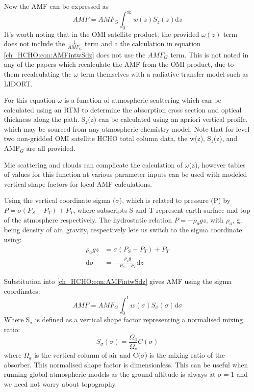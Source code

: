     Now the AMF can be expressed as
    \begin{equation} \label{ch_HCHO:eqn:AMFintwSdz}
      AMF = AMF_G \int_0^\infty w(z) S_z(z) \mathrm{d}z
    \end{equation}
    It's worth noting that in the OMI satellite product, the provided $\omega(z)$ term does not include the $\frac{1}{AMF_G}$ term and a the calculation in equation \ref{ch_HCHO:eqn:AMFintwSdz} does not use the $AMF_G$ term.
    This is not noted in any of the papers which recalculate the AMF from the OMI product, due to them recalculating the $\omega$ term themselves with a radiative transfer model such as LIDORT.
    
    For this equation $\omega$ is a function of atmospheric scattering which can be calculated using an RTM to determine the absorption cross section and optical thickness along the path.
    S$_z$(z) can be calculated using an apriori vertical profile, which may be sourced from any atmospheric chemistry model.
    Note that for level two non-gridded OMI satellite HCHO total column data, the w(z), S$_z$(z), and AMF$_G$ are all provided.
    
    Mie scattering and clouds can complicate the calculation of $\omega$(z), however tables of values for this function at various parameter inputs can be used with modeled vertical shape factors for local AMF calculations.
    
    Using the vertical coordinate sigma ($\sigma$), which is related to pressure (P) by $P=\sigma \left( P_S - P_T \right) + P_T$, where subscripts S and T represent earth surface and top of the atmosphere respectively.
    The hydrostatic relation $P = - \rho_a g z$, with $\rho_a$, g, being density of air, gravity, respectively lets us switch to the sigma coordinate using:
    \begin{align*}
      \rho_a g z & = \sigma \left( P_S - P_T \right) + P_T \\
      \mathrm{d}\sigma  & = - \frac{ \rho_a g }{ P_S - P_T } \mathrm{d}z
    \end{align*}
    
    Substitution into \ref{ch_HCHO:eqn:AMFintwSdz} gives AMF using the sigma coordinates:
    \begin{equation} \label{ch_HCHO:eqn:AMFintwSdsigma}
      AMF = AMF_G \int_0^1 w(\sigma) S_\sigma(\sigma) \mathrm{d}\sigma
    \end{equation}
    Where S$_\sigma$ is defined as a vertical shape factor representing a normalised mixing ratio:
    \begin{equation}
      S_\sigma (\sigma) = \frac{\Omega_a}{\Omega_v}C(\sigma)
    \end{equation}
    where $\Omega_a$ is the vertical column of air and C($\sigma$) is the mixing ratio of the absorber.
    This normalised shape factor is dimensionless.
    This can be useful when running global atmospheric models as the ground altitude is always at $\sigma=1$ and we need not worry about topography.
    
